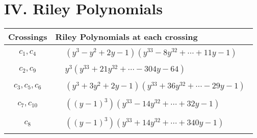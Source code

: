 \documentclass[1p]{elsarticle_modified}
\theoremstyle{definition}
\begin{document}
\centering \section*{ IV. Riley Polynomials}
\begin{tabular}{m{50pt}|m{274pt}}
Crossings & \hspace{64pt}Riley Polynomials at each crossing \\
\hline $$\begin{aligned}c_{1},c_{4}\end{aligned}$$&$\begin{aligned}
&(y^3- y^2+2 y-1)(y^{33}-8 y^{32}+\cdots+11 y-1)
\end{aligned}$\\
\hline $$\begin{aligned}c_{2},c_{9}\end{aligned}$$&$\begin{aligned}
&y^3(y^{33}+21 y^{32}+\cdots-304 y-64)
\end{aligned}$\\
\hline $$\begin{aligned}c_{3},c_{5},c_{6}\end{aligned}$$&$\begin{aligned}
&(y^3+3 y^2+2 y-1)(y^{33}+36 y^{32}+\cdots-29 y-1)
\end{aligned}$\\
\hline $$\begin{aligned}c_{7},c_{10}\end{aligned}$$&$\begin{aligned}
&((y-1)^3)(y^{33}-14 y^{32}+\cdots+32 y-1)
\end{aligned}$\\
\hline $$\begin{aligned}c_{8}\end{aligned}$$&$\begin{aligned}
&((y-1)^3)(y^{33}+14 y^{32}+\cdots+340 y-1)
\end{aligned}$\\
\hline
\end{tabular}
\vskip 2pc
\end{document}
